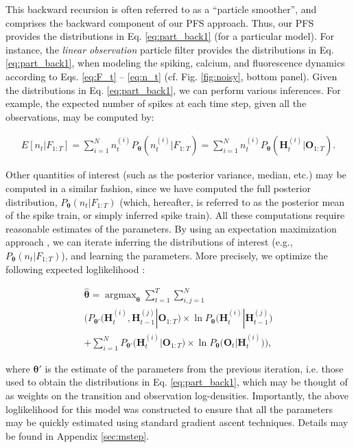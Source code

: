 \documentclass[10pt]{article}
\providecommand{\ve}[1]{\boldsymbol{#1}}
\providecommand{\ve}[1]{\boldsymbol{#1}}
\DeclareMathOperator*{\argmax}{argmax}
\newcommand{\thetn}{\ve{\theta}}
\newcommand{\theto}{\ve{\theta}'}
\newcommand{\p}{P_{\thetn}}
\begin{document}
\noindent This backward recursion is often referred to as a ``particle smoother'', and comprises the backward component of our PFS approach.  Thus, our PFS provides the distributions in Eq. \ref{eq:part_back1} (for a particular model).  For instance, the \emph{linear observation} particle filter provides the distributions in Eq. \ref{eq:part_back1}, when modeling the spiking, calcium, and fluorescence dynamics according to Eqs. \ref{eq:F_t} -- \ref{eq:n_t} (cf. Fig. \ref{fig:noisy}, bottom panel).  Given the distributions in Eq. \ref{eq:part_back1}, we can perform various inferences. For example, the expected number of spikes at each time step, given all the observations, may be computed by:

\begin{align}
E[n_t | F_{1:T}]=  \sum_{i=1}^N n_t^{(i)} \p(n_t^{(i)} | F_{1:T})=
\sum_{i=1}^N n_t^{(i)} \p(\ve{H}_t^{(i)} | \ve{O}_{1:T}). 
\end{align}

\noindent Other quantities of interest (such as the posterior variance, median, etc.) may be computed in a similar fashion, since we have computed the full posterior distribution, $\p(n_t | F_{1:T})$ (which, hereafter, is referred to as the posterior mean of the spike train, or simply inferred spike train). All these computations require reasonable estimates of the parameters. By using an expectation maximization approach \cite{DempsterRubin77}, we can iterate inferring the distributions of interest (e.g., $\p(n_t | F_{1:T})$), and learning the parameters.  More precisely, we optimize the following expected loglikelihood \cite{WillsNinness08}:

\begin{multline} \label{eq:m_tot}
\widehat{\ve{\theta}} = \argmax_{\ve{\theta}} \sum_{t=1}^T  \sum_{i,j=1}^N \\
\Bigg( P_{\theto} \big(\ve{H}_t^{(i)}, \ve{H}_{t-1}^{(j)} | \ve{O}_{1:T}\big)\times \ln \p\big(\ve{H}_t^{(i)} | \ve{H}_{t-1}^{(j)}\big) \\ 
+ \sum_{i=1}^N  P_{\theto} \big(\ve{H}_t^{(i)} | \ve{O}_{1:T}\big) \times \ln \p\big(\ve{O}_t | \ve{H}_t^{(i)}\big)\Bigg), 
\end{multline}

\noindent where $\ve{\theta}'$ is the estimate of the parameters from the previous iteration, i.e. those used to obtain the distributions in Eq. \ref{eq:part_back1},  which may be thought of as weights on the transition and observation log-densities. Importantly, the above loglikelihood for this model was constructed to ensure that all the parameters may be quickly estimated using standard gradient ascent techniques.  %
Details may be found in Appendix \ref{sec:mstep}.
\end{document}
